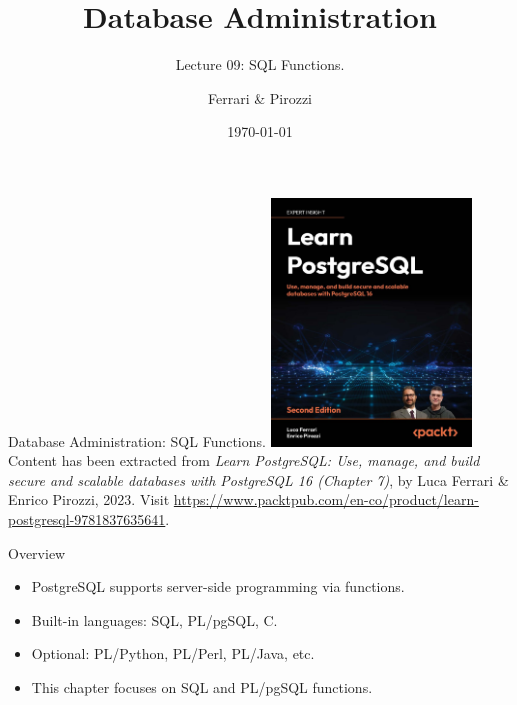 \documentclass{beamer}
\title[SQL Functions]{Database Administration}
\subtitle{Lecture 09: SQL Functions.}
\author{Ferrari \& Pirozzi}
\date{\today}
\begin{document}
\frame{\titlepage}

\begin{frame}{Database Administration: SQL Functions.}
    \centering
    \includegraphics[width=0.4\textwidth]{figures/book_cover}\\
    \vspace{2mm}
    {
        \scriptsize
        Content has been extracted from \textit{Learn PostgreSQL: Use, manage, and build secure and scalable databases with PostgreSQL 16 (Chapter 7)}, by Luca Ferrari \& Enrico Pirozzi, 2023.  Visit \url{https://www.packtpub.com/en-co/product/learn-postgresql-9781837635641}.
    }
\end{frame}

\begin{frame}{Overview}
\begin{itemize}
    \item PostgreSQL supports server-side programming via functions.
    \item Built-in languages: SQL, PL/pgSQL, C.
    \item Optional: PL/Python, PL/Perl, PL/Java, etc.
    \item This chapter focuses on SQL and PL/pgSQL functions.
\end{itemize}
\end{frame}

\lstset{basicstyle=\footnotesize,style=myCustomSQLStyle}

\end{document}
